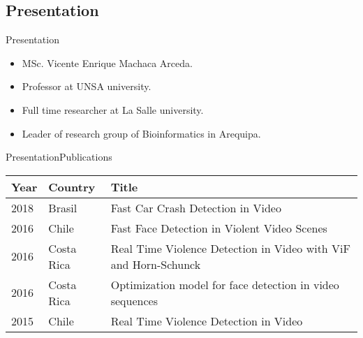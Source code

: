 \documentclass[10pt]{beamer}
\newcommand{\1}{
        	\setbeamertemplate{background}{
        		\texttt{[image: img/1]}
        		\tikz[overlay] \fill[fill opacity=0.75,fill=white] (0,0) rectangle (-\paperwidth,\paperheight);
        	}
}
\begin{document}
\subsection{Presentation}

\begin{frame}{Presentation}{}
	\begin{itemize}
		\item<1-> MSc. Vicente Enrique Machaca Arceda. 
		\item<2-> Professor at UNSA university.
		\item<3-> Full time researcher at La Salle university.		
		\item<4-> Leader of research group of Bioinformatics in Arequipa.
	\end{itemize}
\end{frame}

\begin{frame}{Presentation}{Publications}
	\begin{table}[]
		\setlength{\tabcolsep}{0.5em} %
		{\renewcommand{\arraystretch}{1.4}%
		\begin{tabular}{llp{7cm}}
			\textbf{Year} & \textbf{Country} & \textbf{Title}                                                                                                              \\
			\hline
		
			2018          & Brasil           & Fast Car Crash Detection in Video                                                                                           \\
			2016          & Chile            & Fast Face Detection in Violent Video Scenes                                                                                 \\
			2016          & Costa Rica       & Real Time Violence Detection in Video with ViF and Horn-Schunck                                                             \\
			2016          & Costa Rica       & Optimization model for face detection in video sequences                                                                    \\
			2015          & Chile            & Real Time Violence Detection in Video                                                                                      
		\end{tabular}
	}
	\end{table}
\end{frame}
\end{document}
